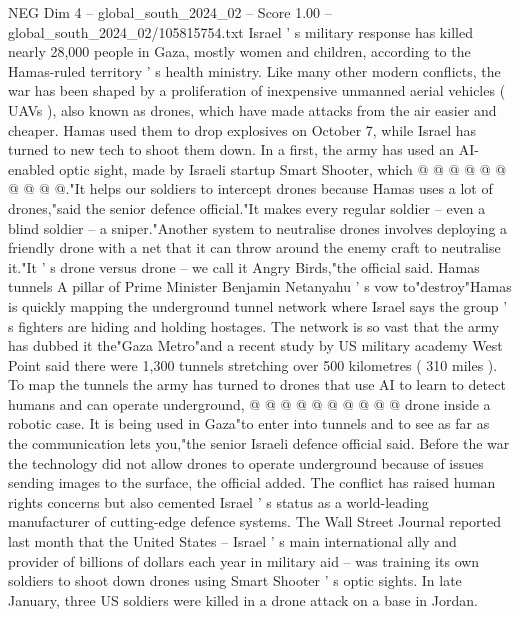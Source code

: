 \begin{textsample}{NEG Dim 4 – global\_south\_2024\_02 – Score 1.00 – global\_south\_2024\_02/105815754.txt}
Israel ' s military response has killed nearly 28,000 people in Gaza, mostly women and children, according to the Hamas-ruled territory ' s health ministry.
Like many other modern conflicts, the war has been shaped by a proliferation of inexpensive unmanned aerial vehicles ( UAVs ), also known as drones, which have made attacks from the air easier and cheaper.
Hamas used them to drop explosives on October 7, while Israel has turned to new tech to shoot them down.
In a first, the army has used an AI-enabled optic sight, made by Israeli startup Smart Shooter, which @ @ @ @ @ @ @ @ @ @."It helps our soldiers to intercept drones because Hamas uses a lot of drones,"said the senior defence official."It makes every regular soldier -- even a blind soldier -- a sniper."Another system to neutralise drones involves deploying a friendly drone with a net that it can throw around the enemy craft to neutralise it."It ' s drone versus drone -- we call it Angry Birds,"the official said.
Hamas tunnels A pillar of Prime Minister Benjamin Netanyahu ' s vow to"destroy"Hamas is quickly mapping the underground tunnel network where Israel says the group ' s fighters are hiding and holding hostages.
The network is so vast that the army has dubbed it the"Gaza Metro"and a recent study by US military academy West Point said there were 1,300 tunnels stretching over 500 kilometres ( 310 miles ).
To map the tunnels the army has turned to drones that use AI to learn to detect humans and can operate underground, @ @ @ @ @ @ @ @ @ @ drone inside a robotic case.
It is being used in Gaza"to enter into tunnels and to see as far as the communication lets you,"the senior Israeli defence official said.
Before the war the technology did not allow drones to operate underground because of issues sending images to the surface, the official added.
The conflict has raised human rights concerns but also cemented Israel ' s status as a world-leading manufacturer of cutting-edge defence systems.
The Wall Street Journal reported last month that the United States -- Israel ' s main international ally and provider of billions of dollars each year in military aid -- was training its own soldiers to shoot down drones using Smart Shooter ' s optic sights.
In late January, three US soldiers were killed in a drone attack on a base in Jordan.

\end{textsample}
